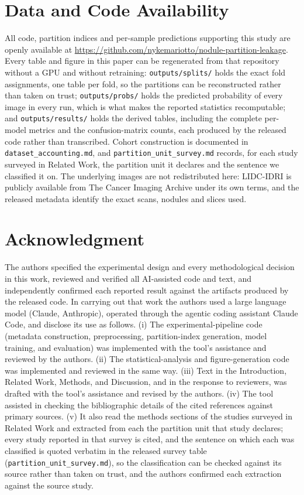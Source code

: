 \documentclass{ieeeaccess}
\begin{document}
\section*{Data and Code Availability}
All code, partition indices and per-sample predictions supporting this study are openly available at
\url{https://github.com/nykemariotto/nodule-partition-leakage}. Every table and figure in this paper
can be regenerated from that repository without a GPU and without retraining: \texttt{outputs/splits/}
holds the exact fold assignments, one table per fold, so the partitions can be reconstructed rather
than taken on trust; \texttt{outputs/probs/} holds the predicted probability of every image in every
run, which is what makes the reported statistics recomputable; and \texttt{outputs/results/} holds
the derived tables, including the complete per-model metrics and the confusion-matrix counts, each
produced by the released code rather than transcribed. Cohort construction is documented in
\texttt{dataset\_accounting.md}, and \texttt{partition\_unit\_survey.md} records, for each study
surveyed in Related Work, the partition unit it declares and the sentence we classified it on. The underlying images are not redistributed here: LIDC-IDRI is
publicly available from The Cancer Imaging Archive under its own terms, and the released metadata
identify the exact scans, nodules and slices used.


\section*{Acknowledgment}
The authors specified the experimental design and every methodological decision in this work,
reviewed and verified all AI-assisted code and text, and independently confirmed each reported
result against the artifacts produced by the released code. In carrying out that work the authors
used a large language model (Claude, Anthropic), operated through the agentic coding assistant
Claude Code, and disclose its use as follows. (i) The experimental-pipeline code (metadata
construction, preprocessing, partition-index generation, model training, and evaluation) was
implemented with the tool's assistance and reviewed by the authors. (ii) The statistical-analysis
and figure-generation code was implemented and reviewed in the same way. (iii) Text in the
Introduction, Related Work, Methods, and Discussion, and in the response to reviewers, was drafted
with the tool's assistance and revised by the authors. (iv) The tool assisted in checking the
bibliographic details of the cited references against primary sources. (v) It also read the methods
sections of the studies surveyed in Related Work and extracted from each the partition unit that
study declares; every study reported in that survey is cited, and the sentence on which each was
classified is quoted verbatim in the released survey table
(\texttt{partition\_unit\_survey.md}), so the classification can be checked against its source
rather than taken on trust, and the authors confirmed each extraction against the source study.
\end{document}
